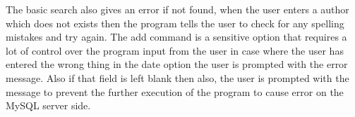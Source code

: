 \documentclass[12pt, a4paper, titlepage, openany]{report}
\begin{document}
The basic search also gives an error if not found, when the user enters a author which does not exists then the program tells the user to check for any spelling mistakes and try again.
The add command is a sensitive option that requires a lot of control over the program input from the user in case where the user has entered the wrong thing in the date option the user is prompted with the error message. Also if that field is left blank then also, the user is prompted with the message to prevent the further execution of the program to cause error on the MySQL server side.


\newpage
\end{document}
